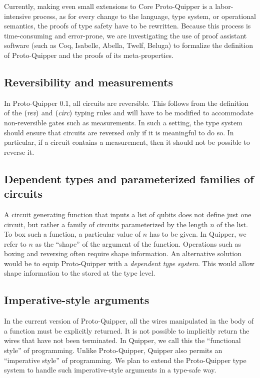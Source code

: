 \documentclass[twoside]{article}
\begin{document}
Currently, making even small extensions to Core Proto-Quipper is a
labor-intensive process, as for every change to the language, type
system, or operational semantics, the proofs of type safety have to be
rewritten. Because this process is time-consuming and error-prone, we
are investigating the use of proof assistant software (such as Coq,
Isabelle, Abella, Twelf, Beluga) to formalize the definition of
Proto-Quipper and the proofs of its meta-properties.

\subsection{Reversibility and measurements}

In Proto-Quipper 0.1, all circuits are reversible. This follows from
the definition of the $(\mathop{\textit{rev}}\nolimits)$ and $(\textit{circ})$ typing rules and
will have to be modified to accommodate non-reversible gates such as
measurements. In such a setting, the type system should ensure that
circuits are reversed only if it is meaningful to do so. In
particular, if a circuit contains a measurement, then it should not be
possible to reverse it.

\subsection{Dependent types and parameterized families of circuits}
 
A circuit generating function that inputs a list of qubits does not
define just one circuit, but rather a family of circuits parameterized
by the length $n$ of the list.  To box such a function, a particular
value of $n$ has to be given. In Quipper, we refer to $n$ as the
``shape'' of the argument of the function. Operations such as boxing
and reversing often require shape information. An alternative solution
would be to equip Proto-Quipper with a {\em dependent type
  system}. This would allow shape information to the stored at the
type level.

\subsection{Imperative-style arguments}

In the current version of Proto-Quipper, all the wires manipulated in
the body of a function must be explicitly returned. It is not possible
to implicitly return the wires that have not been terminated. In
Quipper, we call this the ``functional style'' of programming. Unlike
Proto-Quipper, Quipper also permits an ``imperative style'' of
programming. We plan to extend the Proto-Quipper type system to handle
such imperative-style arguments in a type-safe way.
\end{document}
